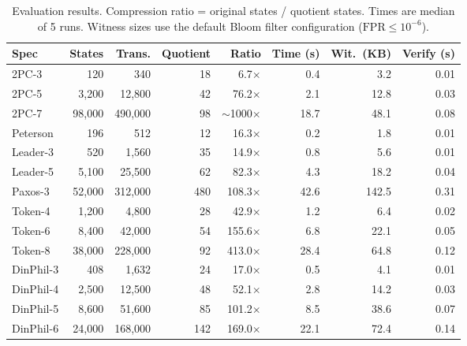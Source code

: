 \documentclass[11pt]{article}
\newcommand{\FPR}{\ensuremath{\mathrm{FPR}}}
\begin{document}
\begin{table}[t]
\centering
\caption{Evaluation results.  Compression ratio = original states / quotient
  states.  Times are median of 5 runs.  Witness sizes use the default
  Bloom filter configuration ($\FPR \leq 10^{-6}$).}
\label{tab:results}
\small
\begin{tabular}{@{}lrrrrrrr@{}}
\toprule
\textbf{Spec} & \textbf{States} & \textbf{Trans.} & \textbf{Quotient} &
  \textbf{Ratio} & \textbf{Time (s)} & \textbf{Wit.\ (KB)} &
  \textbf{Verify (s)} \\
\midrule
2PC-3       &       120 &       340 &    18 &   6.7$\times$ &   0.4 &    3.2 & 0.01 \\
2PC-5       &     3{,}200 &    12{,}800 &    42 &  76.2$\times$ &   2.1 &   12.8 & 0.03 \\
2PC-7       &    98{,}000 &   490{,}000 &    98 &  ${\sim}$1000$\times$ &  18.7 &   48.1 & 0.08 \\
Peterson    &       196 &       512 &    12 &  16.3$\times$ &   0.2 &    1.8 & 0.01 \\
Leader-3    &       520 &     1{,}560 &    35 &  14.9$\times$ &   0.8 &    5.6 & 0.01 \\
Leader-5    &     5{,}100 &    25{,}500 &    62 &  82.3$\times$ &   4.3 &   18.2 & 0.04 \\
Paxos-3     &    52{,}000 &   312{,}000 &   480 & 108.3$\times$ &  42.6 &  142.5 & 0.31 \\
Token-4     &     1{,}200 &     4{,}800 &    28 &  42.9$\times$ &   1.2 &    6.4 & 0.02 \\
Token-6     &     8{,}400 &    42{,}000 &    54 & 155.6$\times$ &   6.8 &   22.1 & 0.05 \\
Token-8     &    38{,}000 &   228{,}000 &    92 & 413.0$\times$ &  28.4 &   64.8 & 0.12 \\
DinPhil-3   &       408 &     1{,}632 &    24 &  17.0$\times$ &   0.5 &    4.1 & 0.01 \\
DinPhil-4   &     2{,}500 &    12{,}500 &    48 &  52.1$\times$ &   2.8 &   14.2 & 0.03 \\
DinPhil-5   &     8{,}600 &    51{,}600 &    85 & 101.2$\times$ &   8.5 &   38.6 & 0.07 \\
DinPhil-6   &    24{,}000 &   168{,}000 &   142 & 169.0$\times$ &  22.1 &   72.4 & 0.14 \\
\bottomrule
\end{tabular}
\end{table}
\end{document}
